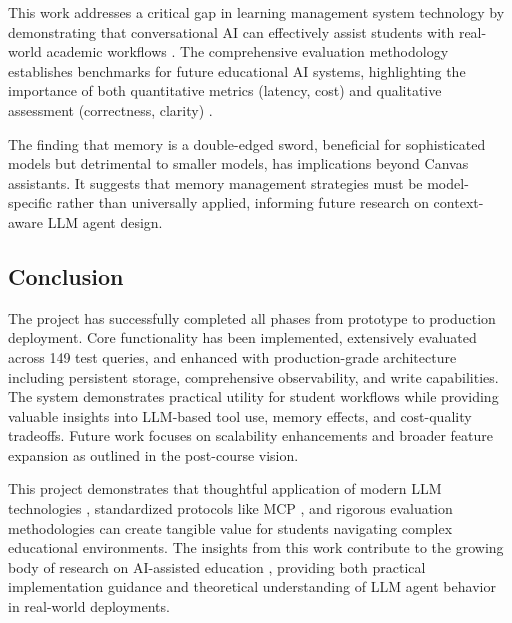 \documentclass{article}
\begin{document}
This work addresses a critical gap in learning management system technology by demonstrating that conversational AI can effectively assist students with real-world academic workflows \cite{genai2024higher, lms2025ai}. The comprehensive evaluation methodology establishes benchmarks for future educational AI systems, highlighting the importance of both quantitative metrics (latency, cost) and qualitative assessment (correctness, clarity) \cite{teachable2025agents}.

The finding that memory is a double-edged sword, beneficial for sophisticated models but detrimental to smaller models, has implications beyond Canvas assistants. It suggests that memory management strategies must be model-specific rather than universally applied, informing future research on context-aware LLM agent design.

\subsection{Conclusion}

The project has successfully completed all phases from prototype to production deployment. Core functionality has been implemented, extensively evaluated across 149 test queries, and enhanced with production-grade architecture including persistent storage, comprehensive observability, and write capabilities. The system demonstrates practical utility for student workflows while providing valuable insights into LLM-based tool use, memory effects, and cost-quality tradeoffs. Future work focuses on scalability enhancements and broader feature expansion as outlined in the post-course vision.

This project demonstrates that thoughtful application of modern LLM technologies \cite{anthropic2025multiagent, llmmas2025software}, standardized protocols like MCP \cite{mcp2025landscape}, and rigorous evaluation methodologies can create tangible value for students navigating complex educational environments. The insights from this work contribute to the growing body of research on AI-assisted education \cite{education2025agentic}, providing both practical implementation guidance and theoretical understanding of LLM agent behavior in real-world deployments.





\appendix
\end{document}
